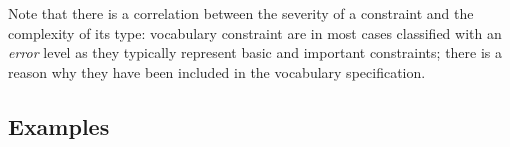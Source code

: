 \documentclass{llncs}
\newcommand{\tb}[1]{\todo[size=\small, color=green!40]{\textbf{Thomas:} #1}}
\begin{document}
Note that there is a correlation between the severity of a constraint and the complexity of its type: vocabulary constraint are in most cases classified with an \emph{error} level as they typically represent basic and important constraints; there is a reason why they have been included in the vocabulary specification.


%
%
%

%


\subsection{Examples}
\label{vocabulary-constraint-types}
\end{document}
